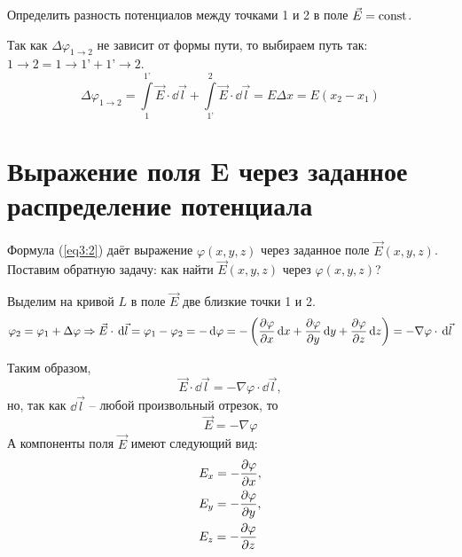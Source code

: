     \begin{example} %
        Определить разность потенциалов между точками 1 и 2 в поле
        \( \vec{E} = \mathrm{const} \).
    \end{example}
    
    \begin{solution}
    Так как \( \Delta\varphi_{1 \to 2} \) не зависит от формы пути, то выбираем 
    путь так: \( 1 \to 2 = 1 \to 1’ + 1’ \to 2 \).
    \[
        \Delta\varphi_{1 \to 2} = \int\limits_1^{1’} \vec{E}\cdot\dd\vec{l} + 
        \int\limits_{1’}^2 \vec{E}\cdot\dd\vec{l} = E \Delta x = E(x_2 - x_1)
    \]
    \end{solution}

\section{Выражение поля \textbf{E} через заданное распределение потенциала}

    Формула (\ref{eq3:2}) даёт выражение \( \varphi (x, y, z) \) через заданное 
    поле \( \vec{E} (x, y, z) \).
    Поставим обратную задачу: как найти \( \vec{E} (x, y, z) \) через
    \( \varphi (x, y, z) \)?
    
    \begin{solution} %
    Выделим на кривой \( L \) в поле \( \vec{E} \) две близкие точки 1 и 2.
    \[
        \varphi_2 = \varphi_1 + \Delta\varphi \Rightarrow 
        \vec{E}\cdot\,\mathrm{d}\vec{l} = \varphi_1 - \varphi_2 = -\,\mathrm{d}\varphi = -
        \left(\frac{\partial \varphi}{\partial x}\,\mathrm{d} x + \frac{\partial \varphi}{\partial y}\,\mathrm{d} y + 
        \frac{\partial \varphi}{\partial z}\,\mathrm{d} z\right) = -\nabla\varphi\cdot\,\mathrm{d}\vec{l} \]
    
    Таким образом,
    \[
        \vec{E}\cdot\dd\vec{l} = -\nabla\varphi\cdot\dd\vec{l},
    \]
    но, так как \( \dd\vec{l} \) -- любой произвольный отрезок, то 
    \begin{equation}
        \label{eq3:3}
        \vec{E} = -\nabla\varphi
    \end{equation}
    А компоненты поля \( \vec{E} \) имеют следующий вид:
    \begin{align*}
        & E_{x} = -\frac{\partial \varphi}{\partial x},\\
        & E_{y} = -\frac{\partial \varphi}{\partial y},\\
        & E_{z} = -\frac{\partial \varphi}{\partial z}
    \end{align*}
    \end{solution}
    
